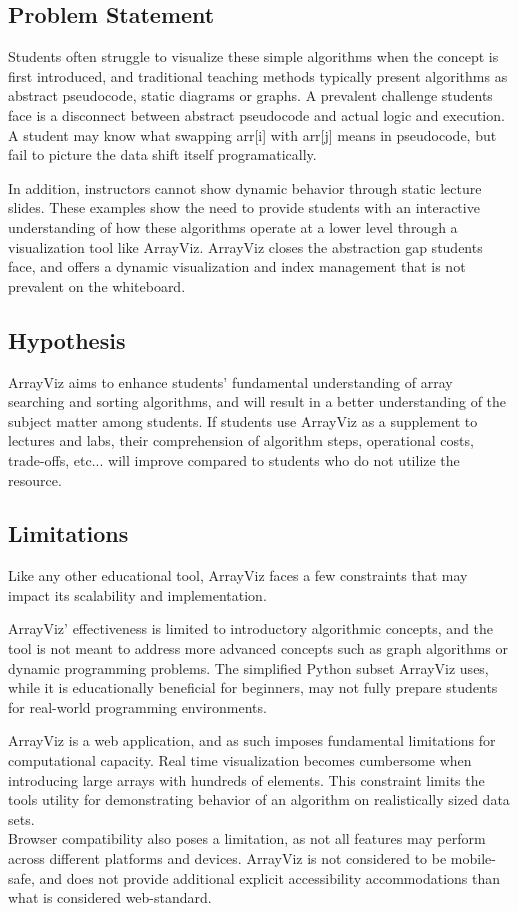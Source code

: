 \documentclass{IEEEtran}
\begin{document}
\subsection{Problem Statement}
Students often struggle to visualize these simple algorithms when the concept is first introduced, and traditional teaching methods typically present algorithms as abstract pseudocode, static diagrams or graphs. A prevalent challenge students face is a disconnect between abstract pseudocode and actual logic and execution. A student may know what swapping arr[i] with arr[j] means in pseudocode, but fail to picture the data shift itself programatically. 

In addition, instructors cannot show dynamic behavior through static lecture slides. These examples show the need to provide students with an interactive understanding of how these algorithms operate at a lower level through a visualization tool like ArrayViz. ArrayViz closes the abstraction gap students face, and offers a dynamic visualization and index management that is not prevalent on the whiteboard.
\subsection{Hypothesis}
ArrayViz aims to enhance students' fundamental understanding of array searching and sorting algorithms, and will result in a better understanding of the subject matter among students. If students use ArrayViz as a supplement to lectures and labs, their comprehension of algorithm steps, operational costs, trade-offs, etc... will improve compared to students who do not utilize the resource.
\subsection{Limitations}
Like any other educational tool, ArrayViz faces a few constraints that may impact its scalability and implementation.

ArrayViz' effectiveness is limited to introductory algorithmic concepts, and the tool is not meant to address more advanced concepts such as graph algorithms or dynamic programming problems. The simplified Python subset ArrayViz uses, while it is educationally beneficial for beginners, may not fully prepare students for real-world programming environments. 

ArrayViz is a web application, and as such imposes fundamental limitations for computational capacity. Real time visualization becomes cumbersome when introducing large arrays with hundreds of elements. This constraint limits the tools utility for demonstrating behavior of an algorithm on realistically sized data sets.
\\
Browser compatibility also poses a limitation, as not all features may perform across different platforms and devices. ArrayViz is not considered to be mobile-safe, and does not provide additional explicit accessibility accommodations than what is considered web-standard.
\end{document}
